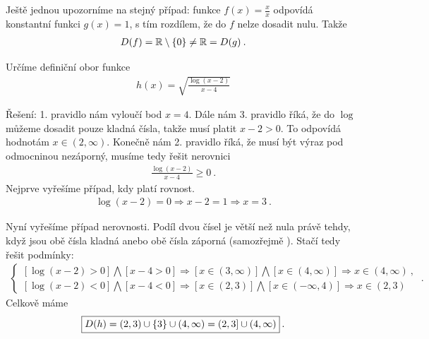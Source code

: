 \begin{example}
    Ještě jednou upozorníme na stejný případ: funkce $f(x) = \frac{x}{x}$ odpovídá konstantní funkci $g(x) = 1$, s tím rozdílem, že do $f$ nelze dosadit nulu. Takže \begin{align*}
        D(f) = \mathbb{R} \setminus \left \lbrace 0 \right \rbrace \neq \mathbb{R} = D(g) \:.
    \end{align*}
    
\end{example}

\begin{example}
    Určíme definiční obor funkce \begin{align*}
        h(x) = \sqrt{ \frac{\log (x-2)}{x-4}}
    \end{align*}

    Řešení: 1. pravidlo nám vyloučí bod $x=4$. 
    Dále nám 3. pravidlo říká, že do $\log$ můžeme dosadit pouze kladná čísla, takže musí platit $x-2>0$. To odpovídá hodnotám $x \in (2, \infty)$. 
    Konečně nám 2. pravidlo říká, že musí být výraz pod odmocninou nezáporný, musíme tedy řešit nerovnici \begin{align*}
        \frac{\log (x-2)}{x-4} \geq 0 \:.
    \end{align*}
    Nejprve vyřešíme případ, kdy platí rovnost.
    \begin{align*}
        \log (x-2) = 0 \Longrightarrow x-2 = 1 \Longrightarrow x = 3 \:.
    \end{align*}
    
    Nyní vyřešíme případ nerovnosti. Podíl dvou čísel je větší než nula právě tehdy, když jsou obě čísla kladná anebo obě čísla záporná (samozřejmě ). Stačí tedy řešit podmínky:
    \begin{align*}
        \begin{cases}
            \left [\log (x-2) > 0 \right] \bigwedge \left[ x-4 > 0\right] \Longrightarrow [x \in (3,\infty)] \bigwedge [x \in (4, \infty)] \Longrightarrow x \in (4, \infty) \:, \\
            \left [\log (x-2) < 0 \right] \bigwedge \left[ x-4 < 0\right] \Longrightarrow [x \in (2,3)] \bigwedge [x \in (-\infty, 4)] \Longrightarrow x \in (2,3)
        \end{cases}
         \:.
    \end{align*}
    Celkově máme \begin{align*}
        \boxed{ D(h) = (2,3) \cup \left \lbrace 3 \right \rbrace \cup (4,\infty) = (2,3] \cup (4,\infty) } \:.
    \end{align*}
\end{example}

